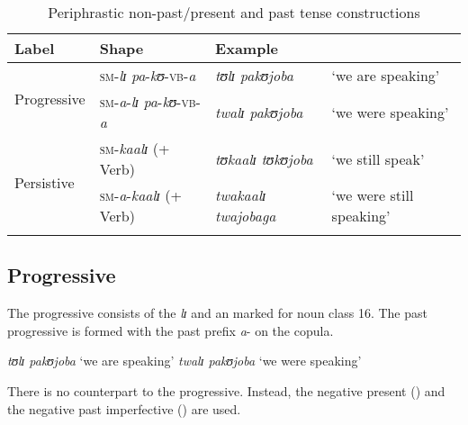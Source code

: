 \begin{table}[H]
\setlength{\tabcolsep}{2pt}
\begin{tabularx}{\textwidth}{llll}
\lsptoprule
\footnotesize{Label} & \footnotesize{Shape} & \footnotesize{Example}\\
\midrule 
\multirow{2}{*}{Progressive} & \textsc{sm}-\textit{lɪ} \textit{pa}-\textit{kʊ}-\textsc{vb}-\textit{a} & \textit{tʊlɪ pakʊjoba} & \lq we are speaking' \\  
& \textsc{sm}-\textit{a}-\textit{lɪ} \textit{pa}-\textit{kʊ}-\textsc{vb}-\textit{a} & \textit{twalɪ pakʊjoba} & \lq we were speaking'\\ 
\multirow{2}{*}{Persistive} & \textsc{sm}-\textit{kaalɪ} (+ Verb) & \textit{tʊkaalɪ tʊkʊjoba} & \lq we still speak'\\ 
 & \textsc{sm}-\textit{a}-\textit{kaalɪ} (+ Verb) & \textit{twakaalɪ twajobaga} & \lq we were still speaking'\\
\lspbottomrule  
\end{tabularx}
\caption{Periphrastic non-past/present and past tense constructions}\label{TableComplexConstructions}
\end{table}

\subsection{Progressive}\label{Progressive}
The progressive consists of the  \textit{lɪ} and an  marked for  noun class 16. The past progressive is formed with the past prefix \textit{a}- on the copula.
\begin{exe}
\ex
\begin{xlist}
\ex \textit{tʊlɪ pakʊjoba} \lq we are speaking'
\ex \textit{twalɪ pakʊjoba} \lq we were speaking'
\end{xlist}
\end{exe}

There is no  counterpart to the progressive. Instead, the negative present () and the negative past imperfective () are used.

